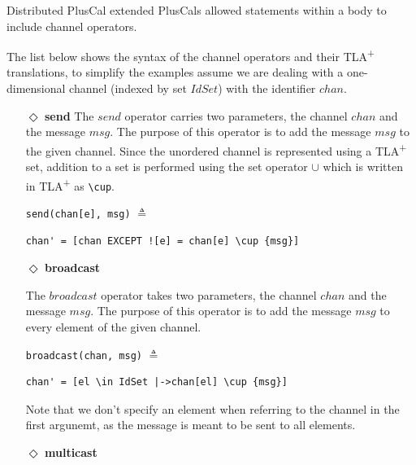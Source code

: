 \documentclass{thesul}
\newcommand{\tlaplus}{TLA\textsuperscript{+}\xspace}
\begin{document}
Distributed PlusCal extended PlusCals allowed statements within a body to include channel operators.

The list below shows the syntax of the channel operators and their \tlaplus translations, to simplify the examples assume we are dealing with a one-dimensional channel (indexed by set $IdSet$) with the identifier $chan$.

\begin{itemize}
\item[$\Diamond$]  \textbf{send} The $send$ operator carries two parameters, the channel $chan$ and the message $msg$. The purpose of this operator is to add the message $msg$ to
the given channel. Since the unordered channel is represented using a \tlaplus set, addition to a set is performed using the set operator $\cup$ which is written in \tlaplus as \lstinline|\cup|.


\begin{minipage}{.24\textwidth}

\lstinline|send(chan[e], msg)| $\triangleq$
\end{minipage}\hfill
\begin{minipage}{\textwidth}
\begin{lstlisting}[frame = none, numbers = none]
chan' = [chan EXCEPT ![e] = chan[e] \cup {msg}]
\end{lstlisting}

\end{minipage}\hfill

\item[$\Diamond$]  \textbf{broadcast}

The $broadcast$ operator takes two parameters, the channel $chan$ and the message $msg$. The purpose of this operator is to add the message $msg$ to every element of the given channel.

\begin{minipage}{.25\textwidth}

\lstinline|broadcast(chan, msg)| $\triangleq$
\end{minipage}\hfill
\begin{minipage}{.8\textwidth}
\begin{lstlisting}[frame = none, numbers = none]
chan' = [el \in IdSet |->chan[el] \cup {msg}]
\end{lstlisting}

\end{minipage}\hfill

Note that we don't specify an element when referring to the channel in the first argunemt, as the message is meant to be sent to all elements.
\item[$\Diamond$] \textbf{multicast}


\end{itemize}
\end{document}
